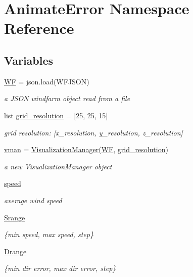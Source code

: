 \hypertarget{namespace_animate_error}{}\section{Animate\+Error Namespace Reference}
\label{namespace_animate_error}
\subsection*{Variables}
\begin{DoxyCompactItemize}
\item 
\mbox{\hyperlink{namespace_animate_error_a25b033c46671da0b48bee3587cf370c1}{WF}} = json.\+load(W\+F\+J\+S\+ON)
\begin{DoxyCompactList}\small\item\em a J\+S\+ON windfarm object read from a file \end{DoxyCompactList}\item 
list \mbox{\hyperlink{namespace_animate_error_a80b6ca5f039907594eec504621ef9574}{grid\+\_\+resolution}} = \mbox{[}25, 25, 15\mbox{]}
\begin{DoxyCompactList}\small\item\em grid resolution\+: \mbox{[}x\+\_\+resolution, y\+\_\+resolution, z\+\_\+resolution\mbox{]} \end{DoxyCompactList}\item 
\mbox{\hyperlink{namespace_animate_error_a7c61e5c3dcf8f34394aafe41966b8bf5}{vman}} = \mbox{\hyperlink{classvisualization__manager___d_j_1_1_visualization_manager}{Visualization\+Manager}}(\mbox{\hyperlink{namespace_animate_error_a25b033c46671da0b48bee3587cf370c1}{WF}}, \mbox{\hyperlink{namespace_animate_error_a80b6ca5f039907594eec504621ef9574}{grid\+\_\+resolution}})
\begin{DoxyCompactList}\small\item\em a new Visualization\+Manager object \end{DoxyCompactList}\item 
\mbox{\hyperlink{namespace_animate_error_a7ee7380c6a63ebc4f737cf5d999f9899}{speed}}
\begin{DoxyCompactList}\small\item\em average wind speed \end{DoxyCompactList}\item 
\mbox{\hyperlink{namespace_animate_error_ac77d30dc25adc76497daa19a97612665}{Srange}}
\begin{DoxyCompactList}\small\item\em \{min speed, max speed, step\} \end{DoxyCompactList}\item 
\mbox{\hyperlink{namespace_animate_error_a88fe8948bcdf9547a6047170052b1308}{Drange}}
\begin{DoxyCompactList}\small\item\em \{min dir error, max dir error, step\} \end{DoxyCompactList}\end{DoxyCompactItemize}


